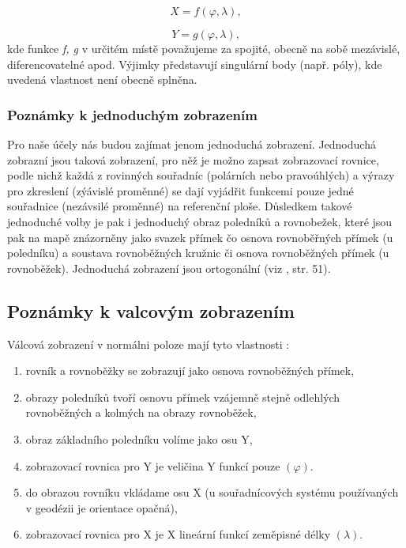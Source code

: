 \documentclass[11pt,a4paper]{article}
\begin{document}
\begin{equation}
X = f\left(\varphi, \lambda\right),
\end{equation}


\begin{equation}
Y = g\left(\varphi, \lambda\right),
\end{equation}
kde funkce \textit{f, g} v určitém místě považujeme za spojité, obecně na sobě mezávislé, diferencovatelné apod. Výjimky představují singulární body (např. póly), kde uvedená vlastnost není obecně splněna.

\subsubsection{Poznámky k jednoduchým zobrazením}
Pro naše účely nás budou zajímat jenom jednoduchá zobrazení. Jednoduchá zobrazní jsou taková zobrazení, pro něž je možno zapsat zobrazovací rovnice, podle nichž každá  z rovinných souřadníc (polárních nebo pravoúhlých) a výrazy pro zkreslení (zýávislé proměnné) se dají vyjádřit funkcemi pouze jedné souřadnice (nezávsilé proměnné) na referenční ploše. Důsledkem takové jednoduché volby je pak i jednoduchý obraz poledníků a rovnobežek, které jsou pak na mapě znázorněny jako svazek přímek čo osnova rovnoběřných přímek (u poledníku) a soustava rovnoběžných kružnic či osnova rovnoběžných přímek (u rovnoběžek). Jednoduchá zobrazení jsou ortogonální (viz \cite{Buchar2002}, str. 51).

\subsection{Poznámky k valcovým zobrazením}
Válcová zobrazení v normálni poloze mají tyto vlastnosti \cite{Buchar2002}:
\begin{enumerate}
\item rovník a rovnoběžky se zobrazují jako osnova rovnoběžných přímek,
\item obrazy poledníků tvoří osnovu přímek vzájemně stejně odlehlých rovnoběžných a kolmých na obrazy rovnoběžek,
\item obraz základního poledníku volíme jako osu Y, 
\item zobrazovací rovnica pro Y je veličina Y funkcí pouze $\left(\varphi\right)$.
\item do obrazou rovníku vkládame osu X (u souřadnícových systému používaných v geodézii je orientace opačná),
\item zobrazovací rovnica pro X je X lineární funkcí zeměpisné délky $\left(\lambda\right)$.
\end{enumerate}
\end{document}
